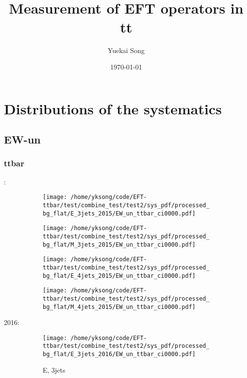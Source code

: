 \documentclass{beamer}
\title{Measurement of EFT operators in tt}
\author{Yuekai Song}
\institute{ZJU}
\date{\today}
\begin{document}
\frame{\titlepage}
\begin{frame}
    \begin{multicols}{3}
        \tableofcontents
    \end{multicols}
\end{frame}

\section{Distributions of the systematics}



\subsection{EW-un}

\begin{frame}
\frametitle{ttbar}
\fontsize{5}{1}:
\begin{figure}
\centering
\begin{subfigure}[b]{0.24\textwidth}
\texttt{[image: /home/yksong/code/EFT-ttbar/test/combine\_test/test2/sys\_pdf/processed\_bg\_flat/E\_3jets\_2015/EW\_un\_ttbar\_ci0000.pdf]}
\end{subfigure}
\begin{subfigure}[b]{0.24\textwidth}
\texttt{[image: /home/yksong/code/EFT-ttbar/test/combine\_test/test2/sys\_pdf/processed\_bg\_flat/M\_3jets\_2015/EW\_un\_ttbar\_ci0000.pdf]}
\end{subfigure}
\begin{subfigure}[b]{0.24\textwidth}
\texttt{[image: /home/yksong/code/EFT-ttbar/test/combine\_test/test2/sys\_pdf/processed\_bg\_flat/E\_4jets\_2015/EW\_un\_ttbar\_ci0000.pdf]}
\end{subfigure}
\begin{subfigure}[b]{0.24\textwidth}
\texttt{[image: /home/yksong/code/EFT-ttbar/test/combine\_test/test2/sys\_pdf/processed\_bg\_flat/M\_4jets\_2015/EW\_un\_ttbar\_ci0000.pdf]}
\end{subfigure}
\end{figure}
2016:
\begin{figure}
\centering
\begin{subfigure}[b]{0.24\textwidth}
\texttt{[image: /home/yksong/code/EFT-ttbar/test/combine\_test/test2/sys\_pdf/processed\_bg\_flat/E\_3jets\_2016/EW\_un\_ttbar\_ci0000.pdf]}
\captionsetup{font=tiny}
\caption{E, 3jets}
\end{subfigure}
\begin{subfigure}[b]{0.24\textwidth}

\end{subfigure}
\end{figure}
\end{frame}
\end{document}
